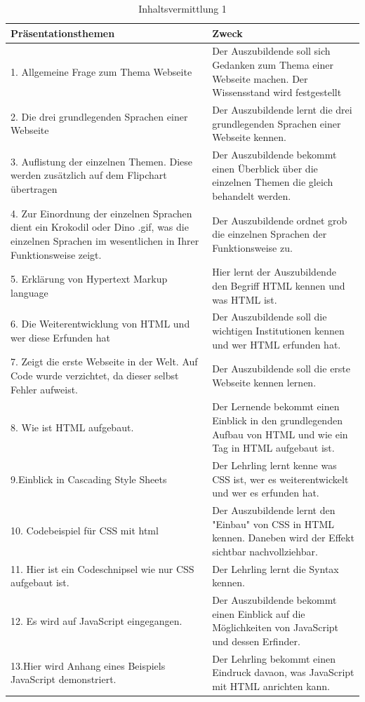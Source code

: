 \documentclass[a4paper, 12pt]{article}
\begin{document}
\newpage
\begin{table}[h!]
	\begin{center}
		\caption{Inhaltsvermittlung 1}
		\label{tab:table1}
		\begin{tabular}{|p{8cm}|p{8cm}|}
			\textbf{Präsentationsthemen} & \textbf{Zweck}\\
			\hline
			1. Allgemeine Frage zum Thema Webseite  & Der Auszubildende soll sich Gedanken zum Thema einer Webseite machen. Der Wissensstand wird festgestellt\\
			\hline
			2. Die drei grundlegenden Sprachen einer Webseite & Der Auszubildende lernt die drei grundlegenden Sprachen einer Webseite kennen.\\
			\hline
			3. Auflistung der einzelnen Themen. Diese werden zusätzlich auf dem Flipchart übertragen & Der Auszubildende bekommt einen Überblick über die einzelnen Themen die gleich behandelt werden.\\
			\hline
			4. Zur Einordnung der einzelnen Sprachen dient ein Krokodil oder Dino .gif, was die einzelnen Sprachen im wesentlichen in Ihrer Funktionsweise zeigt. & Der Auszubildende ordnet grob die einzelnen Sprachen der Funktionsweise zu.\\
			\hline
			5. Erklärung von Hypertext Markup language & Hier lernt der Auszubildende den Begriff HTML kennen und was HTML ist. \\
			\hline
			6. Die Weiterentwicklung von HTML und wer diese Erfunden hat & Der Auszubildende soll die wichtigen Institutionen kennen und wer HTML erfunden hat.\\
			\hline
			7. Zeigt die erste Webseite in der Welt. Auf Code wurde verzichtet, da dieser selbst Fehler aufweist.  & Der Auszubildende soll die erste Webseite kennen lernen. \\
			\hline
			8. Wie ist HTML aufgebaut. & Der Lernende bekommt einen Einblick in den grundlegenden Aufbau von HTML und wie ein Tag in HTML aufgebaut ist.\\
			\hline
			9.Einblick in Cascading Style Sheets & Der Lehrling lernt kenne was CSS ist, wer es weiterentwickelt und wer es erfunden hat. \\
			\hline
			10. Codebeispiel für CSS mit html & Der Auszubildende lernt den "Einbau" von CSS in HTML kennen. Daneben wird der Effekt sichtbar nachvollziehbar.\\
			\hline
			11. Hier ist ein Codeschnipsel wie nur CSS aufgebaut ist. & Der Lehrling lernt die Syntax kennen.\\
			\hline
			12. Es wird auf JavaScript eingegangen. & Der Auszubildende bekommt einen Einblick auf die Möglichkeiten von JavaScript und dessen Erfinder.\\
			\hline
			13.Hier wird Anhang eines Beispiels JavaScript demonstriert. & Der Lehrling bekommt einen Eindruck davaon, was JavaScript mit HTML anrichten kann.\\
			\hline
			\end{tabular}
	\end{center}
\end{table}
\end{document}
